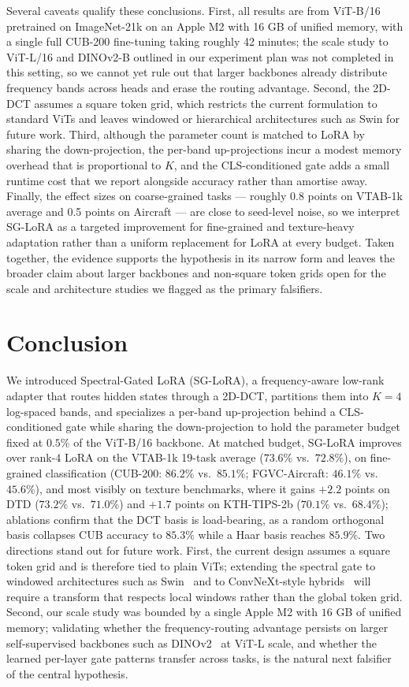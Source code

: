 \documentclass{article}
\begin{document}
Several caveats qualify these conclusions. First, all results are from ViT-B/16 pretrained on ImageNet-21k on an Apple M2 with 16 GB of unified memory, with a single full CUB-200 fine-tuning taking roughly 42 minutes; the scale study to ViT-L/16 and DINOv2-B outlined in our experiment plan was not completed in this setting, so we cannot yet rule out that larger backbones already distribute frequency bands across heads and erase the routing advantage. Second, the 2D-DCT assumes a square token grid, which restricts the current formulation to standard ViTs and leaves windowed or hierarchical architectures such as Swin for future work. Third, although the parameter count is matched to LoRA by sharing the down-projection, the per-band up-projections incur a modest memory overhead that is proportional to $K$, and the CLS-conditioned gate adds a small runtime cost that we report alongside accuracy rather than amortise away. Finally, the effect sizes on coarse-grained tasks — roughly 0.8 points on VTAB-1k average and 0.5 points on Aircraft — are close to seed-level noise, so we interpret SG-LoRA as a targeted improvement for fine-grained and texture-heavy adaptation rather than a uniform replacement for LoRA at every budget. Taken together, the evidence supports the hypothesis in its narrow form and leaves the broader claim about larger backbones and non-square token grids open for the scale and architecture studies we flagged as the primary falsifiers.

\section{Conclusion}
We introduced Spectral-Gated LoRA (SG-LoRA), a frequency-aware low-rank adapter that routes hidden states through a 2D-DCT, partitions them into $K{=}4$ log-spaced bands, and specializes a per-band up-projection behind a CLS-conditioned gate while sharing the down-projection to hold the parameter budget fixed at $0.5\%$ of the ViT-B/16 backbone. At matched budget, SG-LoRA improves over rank-$4$ LoRA on the VTAB-1k 19-task average ($73.6\%$ vs.\ $72.8\%$), on fine-grained classification (CUB-200: $86.2\%$ vs.\ $85.1\%$; FGVC-Aircraft: $46.1\%$ vs.\ $45.6\%$), and most visibly on texture benchmarks, where it gains $+2.2$ points on DTD ($73.2\%$ vs.\ $71.0\%$) and $+1.7$ points on KTH-TIPS-2b ($70.1\%$ vs.\ $68.4\%$); ablations confirm that the DCT basis is load-bearing, as a random orthogonal basis collapses CUB accuracy to $85.3\%$ while a Haar basis reaches $85.9\%$. Two directions stand out for future work. First, the current design assumes a square token grid and is therefore tied to plain ViTs; extending the spectral gate to windowed architectures such as Swin~\citep{liu2021swin} and to ConvNeXt-style hybrids~\citep{liu2022convnext} will require a transform that respects local windows rather than the global token grid. Second, our scale study was bounded by a single Apple M2 with $16$ GB of unified memory; validating whether the frequency-routing advantage persists on larger self-supervised backbones such as DINOv2~\citep{oquab2024dinov2} at ViT-L scale, and whether the learned per-layer gate patterns transfer across tasks, is the natural next falsifier of the central hypothesis.



\end{document}
